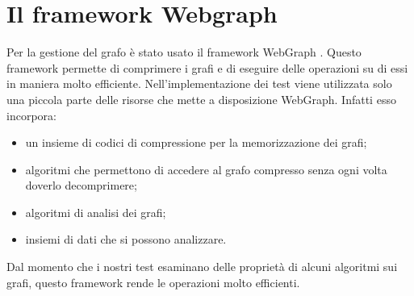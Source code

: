 \section{Il framework Webgraph}
Per la gestione del grafo è stato usato il framework WebGraph \cite{Boldi03thewebgraph}. Questo framework permette di comprimere i grafi e di eseguire delle operazioni su di essi in maniera molto efficiente. Nell'implementazione dei test viene utilizzata solo una piccola parte delle risorse che mette a disposizione WebGraph. Infatti esso incorpora:
\begin{itemize}
 \item un insieme di codici di compressione per la memorizzazione dei grafi;
 \item algoritmi che permettono di accedere al grafo compresso senza ogni volta doverlo decomprimere;
 \item algoritmi di analisi dei grafi;
 \item insiemi di dati che si possono analizzare.
\end{itemize}
Dal momento che i nostri test esaminano delle proprietà di alcuni algoritmi sui grafi, questo framework rende le operazioni molto efficienti.

